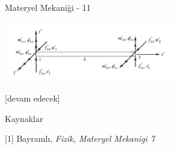 \documentclass[12pt,fleqn]{article}\usepackage{../../common}
\begin{document}
Materyel Mekaniği - 11


\includegraphics[width=20em]{phy_020_strs_11_01.jpg}
















[devam edecek]

Kaynaklar

[1] Bayramlı, {\em Fizik, Materyel Mekanigi 7}
\end{document}
